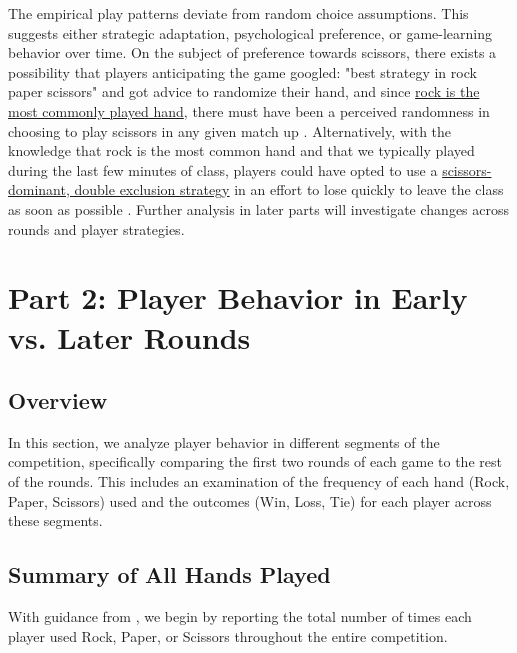 \documentclass[12pt]{article}
\begin{document}
The empirical play patterns deviate from random choice assumptions. This suggests either strategic adaptation, psychological preference, or game-learning behavior over time. On the subject of preference towards scissors, there exists a possibility that players anticipating the game googled: "best strategy in rock paper scissors" and got advice to randomize their hand, and since \href{https://www.fishersci.com/us/en/education-products/publications/headline-discoveries/2025/spring-summer/rock-paper-scissors-science.html#:~:text=In%20RPS%2C%20each%20option%20has,paper%2C%20and%2026%20percent%20scissors.}{rock is the most commonly played hand}, there must have been a perceived randomness in choosing to play scissors in any given match up \cite{northam_rock_2025}. Alternatively, with the knowledge that rock is the most common hand and that we typically played during the last few minutes of class, players could have opted to use a \href{https://wrpsa.com/the-worst-rock-paper-scissors-strategies/}{scissors-dominant, double exclusion strategy} in an effort to lose quickly to leave the class as soon as possible \cite{world_rock_paper_scissors_association_worst_2021}. Further analysis in later parts will investigate changes across rounds and player strategies.

\newpage

\section*{Part 2: Player Behavior in Early vs. Later Rounds}


\subsection*{Overview}
In this section, we analyze player behavior in different segments of the competition, specifically comparing the first two rounds of each game to the rest of the rounds. This includes an examination of the frequency of each hand (Rock, Paper, Scissors) used and the outcomes (Win, Loss, Tie) for each player across these segments.

\subsection*{Summary of All Hands Played}
With guidance from \cite{sawitzki_computational_nodate
}, we begin by reporting the total number of times each player used Rock, Paper, or Scissors throughout the entire competition.
\end{document}
